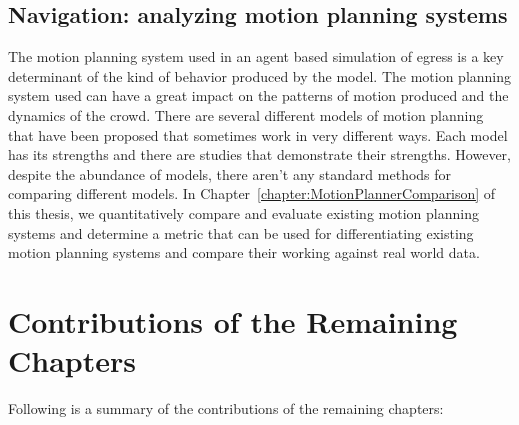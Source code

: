 \subsection{Navigation: analyzing motion planning systems}
\label{IBEVAC:NavigationShortcomings}

    The motion planning system used in an agent based simulation of egress is a key determinant of the kind of behavior produced by the model. The motion planning system used can have a great impact on the patterns of motion produced and the dynamics of the crowd.
    There are several different models of motion planning that have been proposed that sometimes work in very different ways. Each model has its strengths and there are studies that demonstrate their strengths. However, despite the abundance of models, there aren't any standard methods for comparing different models.
    In Chapter~\ref{chapter:MotionPlannerComparison} of this thesis, we quantitatively compare and evaluate existing motion planning systems and determine a metric that can be used for differentiating existing motion planning systems and compare their working against real world data.






\section{Contributions of the Remaining Chapters}
\label{IBEVAC:Contributions}

Following is a summary of the contributions of the remaining chapters:

